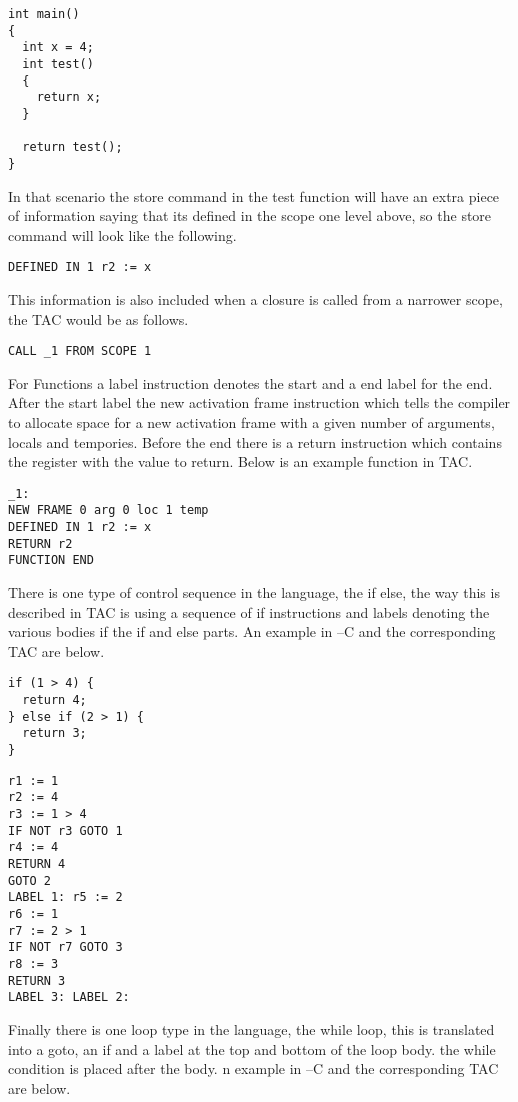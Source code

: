 \documentclass{article}
\begin{document}
\begin{lstlisting}
int main()
{
  int x = 4;
  int test()
  {
    return x;
  }

  return test();
}
\end{lstlisting}

In that scenario the store command in the test function will have an extra piece
of information saying that its defined in the scope one level above, so the store command will
look like the following.

\begin{lstlisting}
DEFINED IN 1 r2 := x
\end{lstlisting}

This information is also included when a closure is called from a narrower scope,
the TAC would be as follows.

\begin{lstlisting}
CALL _1 FROM SCOPE 1
\end{lstlisting}

For Functions a label instruction denotes the start and a end label for the end.
After the start label the new activation frame instruction which tells
the compiler to allocate space for a new activation frame with a given number
of arguments, locals and tempories. Before the end there is a return instruction
which contains the register with the value to return. Below is an example function
in TAC.

\begin{lstlisting}
_1:
NEW FRAME 0 arg 0 loc 1 temp
DEFINED IN 1 r2 := x
RETURN r2
FUNCTION END
\end{lstlisting}

There is one type of control sequence in the language, the if else, the way this
is described in TAC is using a sequence of if instructions and labels denoting the
various bodies if the if and else parts. An example in --C and the corresponding TAC
are below.

\begin{lstlisting}
if (1 > 4) {
  return 4;
} else if (2 > 1) {
  return 3;
}
\end{lstlisting}

\begin{lstlisting}
r1 := 1
r2 := 4
r3 := 1 > 4
IF NOT r3 GOTO 1
r4 := 4
RETURN 4
GOTO 2
LABEL 1: r5 := 2
r6 := 1
r7 := 2 > 1
IF NOT r7 GOTO 3
r8 := 3
RETURN 3
LABEL 3: LABEL 2:
\end{lstlisting}

Finally there is one loop type in the language, the while loop, this is translated
into a goto, an if and a label at the top and bottom of the loop body. the while
condition is placed after the body. n example in --C and the corresponding TAC
are below.
\end{document}
